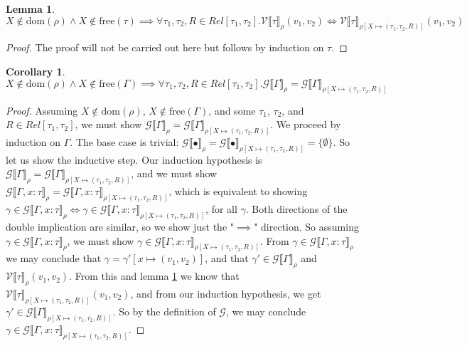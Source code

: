 \documentclass[a4paper, 11pt]{report}
\newtheorem{corollary}{Corollary}[theorem]
\newtheorem{lemma}[theorem]{Lemma}
\theoremstyle{definition}
\newcommand{\var}{x}
\newcommand{\val}{v}
\newcommand{\Tvar}{X}
\newcommand{\typ}{\tau}
\newcommand{\venv}{\Gamma}
\newcommand{\empvenv}{\bullet}
\newcommand{\ValInp}[2]{\mathcal{V} \llbracket #1 \rrbracket_{#2}}
\newcommand{\VenvInp}[2]{\mathcal{G} \llbracket #1 \rrbracket_{#2}}
\newcommand{\map}[2]{#1 \mapsto #2}
\begin{document}
\begin{lemma}\label{lem:ValInpTypSub}
  $\Tvar \notin \mathrm{dom}(\rho) \land \Tvar \notin \mathrm{free}(\tau) \implies \forall \typ_1, \typ_2, R \in Rel[\typ_1, \typ_2] . \ValInp{\typ}{\rho}(\val_1, \val_2) \iff \ValInp{\typ}{\rho[\map{\Tvar}{(\typ_1, \typ_2, R)}]}(\val_1, \val_2)$
\end{lemma}
\begin{proof}
  The proof will not be carried out here but follows by induction on $\typ$.
\end{proof}

\begin{corollary}\label{cor:VenvInp}
  $\Tvar \notin \mathrm{dom}(\rho) \land \Tvar \notin \mathrm{free}(\venv) \implies \forall \typ_1, \typ_2, R \in Rel[\typ_1, \typ_2] . \VenvInp{\venv}{\rho} = \VenvInp{\venv}{\rho[\map{\Tvar}{(\typ_1, \typ_2, R)}]}$
\end{corollary}
\begin{proof}
  Assuming $\Tvar \notin \mathrm{dom}(\rho)$, $\Tvar \notin \mathrm{free}(\venv)$, and some $\typ_1$, $\typ_2$, and $R \in Rel[\typ_1, \typ_2]$, we must show $\VenvInp{\venv}{\rho} = \VenvInp{\venv}{\rho[\map{\Tvar}{(\typ_1, \typ_2, R)}]}$. We proceed by induction on $\venv$. The base case is trivial: $\VenvInp{\empvenv}{\rho} = \VenvInp{\empvenv}{\rho[\map{\Tvar}{(\typ_1, \typ_2, R)}]} = \{\emptyset\}$. So let us show the inductive step. Our induction hypothesis is $\VenvInp{\venv}{\rho} = \VenvInp{\venv}{\rho[\map{\Tvar}{(\typ_1, \typ_2, R)}]}$, and we must show $\VenvInp{\venv, \var : \typ}{\rho} = \VenvInp{\venv, \var : \typ}{\rho[\map{\Tvar}{(\typ_1, \typ_2, R)}]}$, which is equivalent to showing $\gamma \in \VenvInp{\venv, \var : \typ}{\rho} \iff \gamma \in \VenvInp{\venv, \var : \typ}{\rho[\map{\Tvar}{(\typ_1, \typ_2, R)}]}$, for all $\gamma$. Both directions of the double implication are similar, so we show just the "$\implies$" direction. So assuming $\gamma \in \VenvInp{\venv, \var : \typ}{\rho}$, we must show $\gamma \in \VenvInp{\venv, \var : \typ}{\rho[\map{\Tvar}{(\typ_1, \typ_2, R)}]}$. From $\gamma \in \VenvInp{\venv, \var : \typ}{\rho}$ we may conclude that $\gamma = \gamma'[\map{\var}{(\val_1, \val_2)}]$, and that $\gamma' \in \VenvInp{\venv}{\rho}$ and $\ValInp{\typ}{\rho}(\val_1, \val_2)$. From this and lemma \ref{lem:ValInpTypSub} we know that $\ValInp{\typ}{\rho[\map{\Tvar}{(\typ_1, \typ_2, R)}]}(\val_1, \val_2)$, and from our induction hypothesis, we get $\gamma' \in \VenvInp{\venv}{\rho[\map{\Tvar}{(\typ_1, \typ_2, R)}]}$. So by the definition of $\mathcal{G}$, we may conclude $\gamma \in \VenvInp{\venv, \var : \typ}{\rho[\map{\Tvar}{(\typ_1, \typ_2, R)}]}$.
\end{proof}
\end{document}
